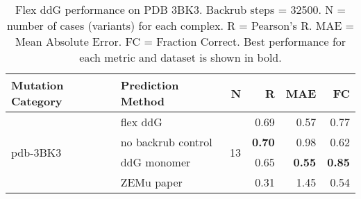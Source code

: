 \begin{table}
  \begin{tabular}{llrrrr}
\toprule
Mutation Category &   Prediction Method &   N &    R &  MAE &   FC \\
\midrule
 \multirow{ 4}{*}{pdb-3BK3} & flex ddG & \multirow{ 4}{*}{13} & 0.69 & 0.57 & 0.77  \\
 & no backrub control & & \textbf{0.70} & 0.98 & 0.62  \\
 & ddG monomer & & 0.65 & \textbf{0.55} & \textbf{0.85}  \\
 & ZEMu paper & & 0.31 & 1.45 & 0.54  \\
\bottomrule
\end{tabular}
  \caption[Flex ddG performance on PDB 3BK3]{
    Flex ddG performance on PDB 3BK3. Backrub steps = 32500. N = number of cases (variants) for each complex. R = Pearson's R. MAE = Mean Absolute Error. FC = Fraction Correct. Best performance for each metric and dataset is shown in bold.
  } \label{tab:table-pdb-3BK3}
\end{table}
